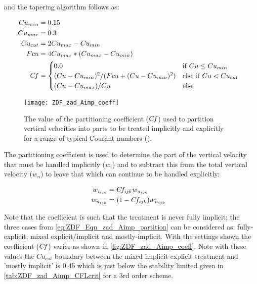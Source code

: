 \documentclass[../main/NEMO_manual]{subfiles}
\newcommand{\cf}{\ensuremath{C\kern-0.14em f}}
\begin{document}
\noindent and the tapering algorithm follows \citep{shchepetkin_OM15} as:

\begin{align}
  \label{eq:ZDF_Eqn_zad_Aimp_partition}
Cu_{min} &= 0.15 \nonumber \\
Cu_{max} &= 0.3  \nonumber \\
Cu_{cut} &= 2Cu_{max} - Cu_{min} \nonumber \\
Fcu    &= 4Cu_{max}*(Cu_{max}-Cu_{min}) \nonumber \\
\cf &=
     \begin{cases}
        0.0                                                        &\text{if $Cu \leq Cu_{min}$} \\
        (Cu - Cu_{min})^2 / (Fcu +  (Cu - Cu_{min})^2)             &\text{else if $Cu < Cu_{cut}$} \\
        (Cu - Cu_{max}) / Cu                                       &\text{else}
     \end{cases}
\end{align}

\begin{figure}[!t]
  \centering
  \texttt{[image: ZDF\_zad\_Aimp\_coeff]}
  \caption[Partitioning coefficient used to partition vertical velocities into parts]{
    The value of the partitioning coefficient (\cf) used to partition vertical velocities into
    parts to be treated implicitly and explicitly for a range of typical Courant numbers
    ().}
  \label{fig:ZDF_zad_Aimp_coeff}
\end{figure}

\noindent The partitioning coefficient is used to determine the part of the vertical
velocity that must be handled implicitly ($w_i$) and to subtract this from the total
vertical velocity ($w_n$) to leave that which can continue to be handled explicitly:

\begin{align}
  \label{eq:ZDF_Eqn_zad_Aimp_partition2}
    w_{i_{ijk}} &= \cf_{ijk} w_{n_{ijk}}     \nonumber \\
    w_{n_{ijk}} &= (1-\cf_{ijk}) w_{n_{ijk}}
\end{align}

\noindent Note that the coefficient is such that the treatment is never fully implicit;
the three cases from \autoref{eq:ZDF_Eqn_zad_Aimp_partition} can be considered as:
fully-explicit; mixed explicit/implicit and mostly-implicit.  With the settings shown the
coefficient (\cf) varies as shown in \autoref{fig:ZDF_zad_Aimp_coeff}. Note with these values
the $Cu_{cut}$ boundary between the mixed implicit-explicit treatment and 'mostly
implicit' is 0.45 which is just below the stability limited given in
\autoref{tab:ZDF_zad_Aimp_CFLcrit}  for a 3rd order scheme.
\end{document}
